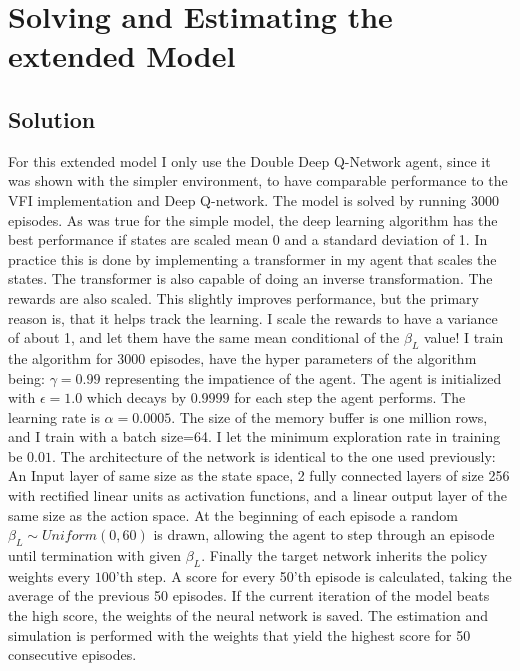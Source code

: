 \section{Solving and Estimating the extended Model}

\subsection{Solution}

For this extended model I only use the Double Deep Q-Network agent, since it was shown with the simpler environment, to have comparable performance to the VFI implementation and Deep Q-network. The model is solved by running 3000 episodes. As was true for the simple model, the deep learning algorithm has the best performance if states are scaled mean 0 and a standard deviation of 1. In practice this is done by implementing a transformer in my agent that scales the states.  The transformer is also capable of doing an inverse transformation. The rewards are also scaled. This slightly improves performance, but the primary reason is, that it helps track the learning. I scale the rewards to have a variance of about 1, and let them have the same mean conditional of the $\beta_L$  value! I train the algorithm for 3000 episodes, have the hyper parameters of the algorithm being: $\gamma=0.99$ representing the impatience of the agent. The agent is initialized with $\epsilon=1.0$ which decays by $0.9999$ for each step the agent performs. The learning rate is $\alpha=0.0005$. The size of the memory buffer is one million rows, and I train with a batch size=64. I let the minimum exploration rate in training be $0.01$.  The architecture of the network is identical to the one used previously: An Input layer of same size as the state space, 2 fully connected layers of size 256 with rectified linear units as activation functions, and a linear output layer of the same size as the action space. At the beginning of each episode a random $\beta_L \sim Uniform(0, 60)$ is drawn, allowing the agent to step through an episode until termination with given $\beta_L$. Finally the target network inherits the policy weights every $100$'th step. A score for every 50'th episode is calculated, taking the average of the previous 50 episodes. If the current iteration of the model beats the high score, the weights of the neural network is saved. The estimation and simulation is performed with the weights that yield the highest score for 50 consecutive episodes. 

